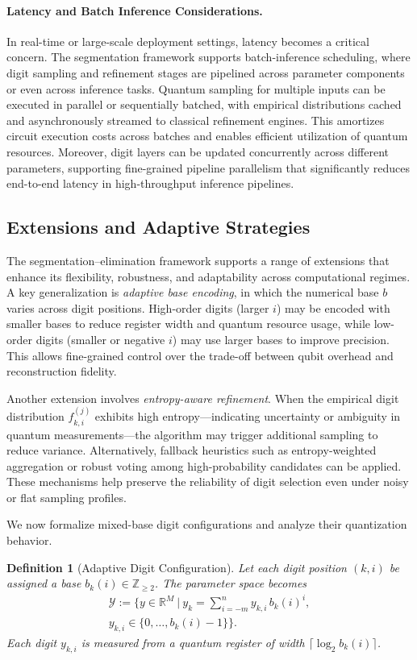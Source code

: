 \documentclass[aps,twocolumn,superscriptaddress,nofootinbib]{revtex4}
\newtheorem{definition}{Definition}
\begin{document}
\paragraph{Latency and Batch Inference Considerations.}
In real-time or large-scale deployment settings, latency becomes a critical concern. The segmentation framework supports batch-inference scheduling, where digit sampling and refinement stages are pipelined across parameter components or even across inference tasks. Quantum sampling for multiple inputs can be executed in parallel or sequentially batched, with empirical distributions cached and asynchronously streamed to classical refinement engines. This amortizes circuit execution costs across batches and enables efficient utilization of quantum resources. Moreover, digit layers can be updated concurrently across different parameters, supporting fine-grained pipeline parallelism that significantly reduces end-to-end latency in high-throughput inference pipelines.


\subsection{Extensions and Adaptive Strategies}
The segmentation--elimination framework supports a range of extensions that enhance its flexibility, robustness, and adaptability across computational regimes. A key generalization is \emph{adaptive base encoding}, in which the numerical base \( b \) varies across digit positions. High-order digits (larger \( i \)) may be encoded with smaller bases to reduce register width and quantum resource usage, while low-order digits (smaller or negative \( i \)) may use larger bases to improve precision. This allows fine-grained control over the trade-off between qubit overhead and reconstruction fidelity.

Another extension involves \emph{entropy-aware refinement}. When the empirical digit distribution \( f^{(j)}_{k,i} \) exhibits high entropy—indicating uncertainty or ambiguity in quantum measurements—the algorithm may trigger additional sampling to reduce variance. Alternatively, fallback heuristics such as entropy-weighted aggregation or robust voting among high-probability candidates can be applied. These mechanisms help preserve the reliability of digit selection even under noisy or flat sampling profiles.

We now formalize mixed-base digit configurations and analyze their quantization behavior.

\begin{definition}[Adaptive Digit Configuration]
Let each digit position $(k,i)$ be assigned a base \( b_k(i) \in \mathbb{Z}_{\geq 2} \). The parameter space becomes
\begin{multline}
\mathcal{Y} := \Big\{ y \in \mathbb{R}^M \ \big| \ 
y_k = \sum_{i=-m}^n y_{k,i} \, b_k(i)^i, \\
y_{k,i} \in \{0,\dots,b_k(i) - 1\} \Big\}.
\end{multline}
Each digit $y_{k,i}$ is measured from a quantum register of width \( \lceil \log_2 b_k(i) \rceil \).
\end{definition}
\end{document}
